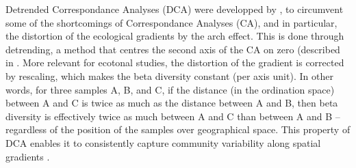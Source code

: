 \documentclass[
]{article}
\begin{document}
Detrended Correspondance Analyses (DCA) were developped by
\autocite{Hill:1980wk}, to circumvent some of the shortcomings of
Correspondance Analyses (CA), and in particular, the distortion of the
ecological gradients by the arch effect. This is done through
detrending, a method that centres the second axis of the CA on zero
(described in \autocite{Gauch:1982tu}. More relevant for ecotonal
studies, the distortion of the gradient is corrected by rescaling, which
makes the beta diversity constant (per axis unit). In other words, for
three samples A, B, and C, if the distance (in the ordination space)
between A and C is twice as much as the distance between A and B, then
beta diversity is effectively twice as much between A and C than between
A and B -- regardless of the position of the samples over geographical
space. This property of DCA enables it to consistently capture community
variability along spatial gradients \autocite{Feilhauer:2009uz}.

\printbibliography
\end{document}
